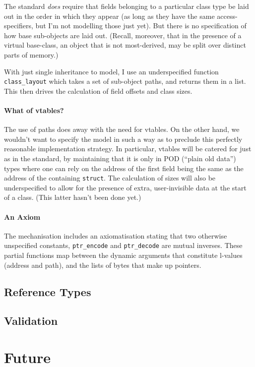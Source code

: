 \documentclass[11pt]{article}
\begin{document}
The standard \emph{does} require that fields belonging to a particular
class type be laid out in the order in which they appear (as long as
they have the same access-specifiers, but I'm not modelling those just
yet).  But there is no specification of how base sub-objects are laid
out.  (Recall, moreover, that in the presence of a virtual base-class,
an object that is not most-derived, may be split over distinct parts
of memory.)

With just single inheritance to model, I use an underspecified
function \texttt{class\_layout} which takes a set of sub-object paths,
and returns them in a list.  This then drives the calculation of field
offsets and class sizes.

\paragraph{What of vtables?}
The use of paths does away with the need for vtables.  On the other
hand, we wouldn't want to specify the model in such a way as to
preclude this perfectly reasonable implementation strategy.  In
particular, vtables will be catered for just as in the standard, by
maintaining that it is only in POD (``plain old data'') types where
one can rely on the address of the first field being the same as the
address of the containing \texttt{struct}.  The calculation of sizes
will also be underspecified to allow for the presence of extra,
user-invisible data at the start of a class.  (This latter hasn't been
done yet.)

\paragraph{An Axiom}
The mechanisation includes an axiomatisation stating that two
otherwise unspecified constants, \texttt{ptr\_encode} and
\texttt{ptr\_decode} are mutual inverses.  These partial functions map
between the dynamic arguments that constitute l-values (address and
path), and the lists of bytes that make up pointers.

\subsection{Reference Types}
\label{sec:reftypes}




\subsection{Validation}
\label{sec:validation}

\section{Future}



\end{document}
